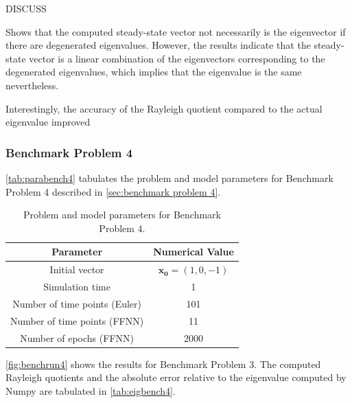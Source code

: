 DISCUSS

Shows that the computed steady-state vector not necessarily is the eigenvector if there are degenerated eigenvalues. However, the results indicate that the steady-state vector is a linear combination of the eigenvectors corresponding to the degenerated eigenvalues, which implies that the eigenvalue is the same nevertheless. 

Interestingly, the accuracy of the Rayleigh quotient compared to the actual eigenvalue improved 


\subsubsection{Benchmark Problem 4}

\autoref{tab:parabench4} tabulates the problem and model parameters for Benchmark Problem 4 described in \autoref{sec:benchmark problem 4}.

\begin{table}[H]
\caption{Problem and model parameters for Benchmark Problem 4.}
\centering
{}
\begin{tabular}{c|c}
\hline
\hline 
Parameter & Numerical Value
\\
\hline 
\hline 
Initial vector & $\bm{x_0}=(1, 0, -1)$
\\
Simulation time & 1
\\
Number of time points (Euler) & 101
\\
Number of time points (FFNN) & 11
\\
Number of epochs (FFNN) & 2000
\\
\hline
\hline 
\end{tabular}
\label{tab:parabench4}
\end{table}

\autoref{fig:benchrun4} shows the results for Benchmark Problem 3. The computed Rayleigh quotients and the absolute error relative to the eigenvalue computed by Numpy are tabulated in \autoref{tab:eigbench4}. 


